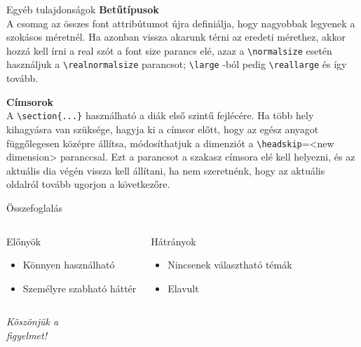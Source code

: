 \documentclass{beamer}
\begin{document}
\begin{frame}[fragile]{Egyéb tulajdonságok}
\large \textbf{Betűtípusok} \\
\normalsize
A csomag az összes font attribútumot újra definiálja, hogy nagyobbak legyenek a szokásos méretnél.
Ha azonban vissza akarunk térni az eredeti mérethez, akkor hozzá kell írni a real szót a font size parancs elé, azaz a \color{red}\verb|\normalsize| \color{black}esetén használjuk a \color{red}\verb|\realnormalsize| \color{black}parancsot; \color{red}\verb|\large| \color{black}-ból pedig \color{red}\verb|\reallarge| \color{black}és így tovább.

\large \textbf{Címsorok} \\
\normalsize
A \color{red}\verb|\section{...}| \color{black}használható a diák első szintű fejlécére. Ha több hely kihagyásra van szüksége, hagyja ki a címsor előtt, hogy az egész anyagot függőlegesen középre állítsa, módosíthatjuk a dimenziót a \color{red}\verb|\headskip|={<new dimension>} \color{black} paranccsal. Ezt a parancsot a szakasz címsora elé kell helyezni, és az aktuális dia végén vissza kell állítani, ha nem szeretnénk, hogy az aktuális oldalról tovább ugorjon a következőre.


\end{frame}


\begin{frame}[fragile]{Összefoglalás}
\begin{columns}[T]
\begin{block}{\color{green}Előnyök}
\begin{itemize}
\item Könnyen használható
\item Személyre szabható háttér
\end{itemize}

\end{block}
\begin{block}{\color{red}Hátrányok}

\begin{itemize}
\item Nincsenek választható témák
\item Elavult
\end{itemize}
\end{block}

\end{columns}
\end{frame}



\begin{frame}
\centering \Large
  \emph{Köszönjük a \\ figyelmet!}
\end{frame}
\end{document}
